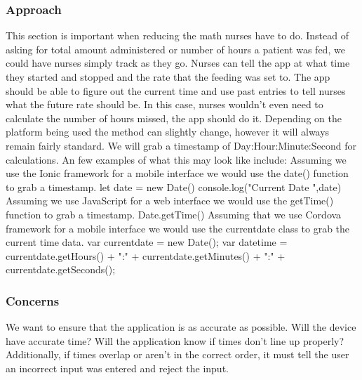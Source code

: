 \documentclass[onecolumn, draftclsnofoot,10pt, compsoc]{IEEEtran}
\begin{document}
\subsubsection{Approach}
This section is important when reducing the math nurses have to do. Instead of asking for total amount administered or number of hours a patient was fed, we could have nurses simply track as they go. Nurses can tell the app at what time they started and stopped and the rate that the feeding was set to. The app should be able to figure out the current time and use past entries to tell nurses what the future rate should be. In this case, nurses wouldn't even need to calculate the number of hours missed, the app should do it. Depending on the platform being used the method can slightly change, however it will always remain fairly standard. We will grab a timestamp of Day:Hour:Minute:Second for calculations. 
\newline
\newline
An few examples of what this may look like include: 
\newline
\newline
Assuming we use the Ionic framework for a mobile interface we would use the date() function to grab a timestamp.
\newline
\indent let date = new Date()\newline
\indent console.log("Current Date ",date)
\newline
\newline
Assuming we use JavaScript for a web interface we would use the getTime() function to grab a timestamp.
\newline
\indent Date.getTime()
\newline
\newline
Assuming that we use Cordova framework for a mobile interface we would use the currentdate class to grab the current time data.
\newline
\indent var currentdate = new Date(); \newline
\indent var datetime = currentdate.getHours() + ":"\newline
\indent \indent \indent + currentdate.getMinutes() + ":" \newline
\indent \indent \indent + currentdate.getSeconds();\newline
\subsubsection{Concerns}
We want to ensure that the application is as accurate as possible. Will the device have accurate time? Will the application know if times don't line up properly? Additionally, if times overlap or aren't in the correct order, it must tell the user an incorrect input was entered and reject the input.
\end{document}
